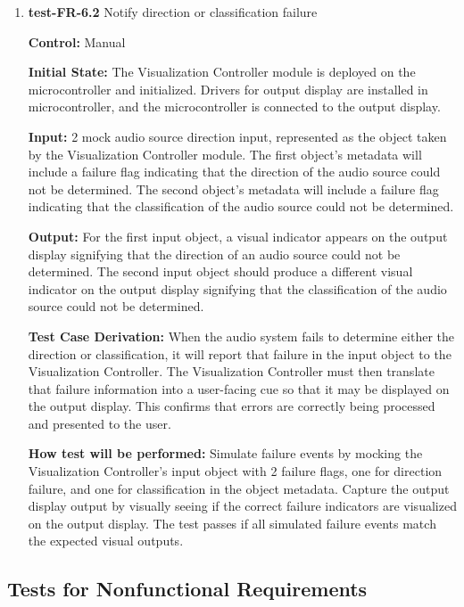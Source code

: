\documentclass[12pt, titlepage]{article}
\begin{document}
\begin{enumerate}
\item{\textbf{test-FR-6.2} Notify direction or classification failure\\}

\textbf{Control:} Manual
					
\textbf{Initial State:}
The Visualization Controller module is deployed on the microcontroller and 
initialized. Drivers for output display are installed in microcontroller, 
and the microcontroller is connected to the output display. 
					
\textbf{Input:}
2 mock audio source direction input, represented as the object taken by the 
Visualization Controller module. The first object's metadata will include a 
failure flag indicating that the direction of the audio source could not be
determined. The second object's metadata will include a failure flag indicating 
that the classification of the audio source could not be determined.
					
\textbf{Output:}
For the first input object, a visual indicator appears on the output display 
signifying that the direction of an audio source could not be determined. 
The second input object should produce a different visual indicator on the 
output display signifying that the classification of the audio source could not
be determined. 

\textbf{Test Case Derivation:} 
When the audio system fails to determine either the direction or classification,
 it will report that failure in the input object to the Visualization Controller.
 The Visualization Controller must then translate that failure information into 
a user-facing cue so that it may be displayed on the output display. This 
confirms that errors are correctly being processed and presented to the user. 
					
\textbf{How test will be performed:}
Simulate failure events by mocking the Visualization Controller's input object 
with 2 failure flags, one for direction failure, and one for classification in 
the object metadata. Capture the output display output by visually seeing if 
the correct failure indicators are visualized on the output display. The test 
passes if all simulated failure events match the expected visual outputs.

\end{enumerate}


\subsection{Tests for Nonfunctional Requirements}
\end{document}
